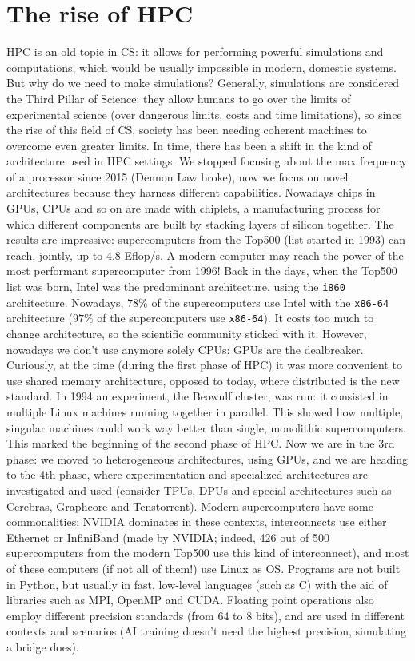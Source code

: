 \chapter{The rise of HPC}

HPC is an old topic in CS: it allows for performing powerful simulations and computations, which would be usually impossible in modern, domestic systems. But why do we need to make simulations? Generally, simulations are considered the Third Pillar of Science: they allow humans to go over the limits of experimental science (over dangerous limits, costs and time limitations), so since the rise of this field of CS, society has been needing coherent machines to overcome even greater limits.
\nwl
In time, there has been a shift in the kind of architecture used in HPC settings. We stopped focusing about the max frequency of a processor since 2015 (Dennon Law broke), now we focus on novel architectures because they harness different capabilities. Nowadays chips in GPUs, CPUs and so on are made with chiplets, a manufacturing process for which different components are built by stacking layers of silicon together.
\nwl
The results are impressive: supercomputers from the Top500 (list started in 1993) can reach, jointly, up to 4.8 Eflop/s. A modern computer may reach the power of the most performant supercomputer from 1996!
\nwl
Back in the days, when the Top500 list was born, Intel was the predominant architecture, using the \verb|i860| architecture. Nowadays, $78\%$ of the supercomputers use Intel with the \verb|x86-64| architecture ($97\%$ of the supercomputers use \verb|x86-64|). It costs too much to change architecture, so the scientific community sticked with it. However, nowadays we don't use anymore solely CPUs: GPUs are the dealbreaker.
\nwl
Curiously, at the time (during the first phase of HPC) it was more convenient to use shared memory architecture, opposed to today, where distributed is the new standard. In 1994 an experiment, the Beowulf cluster, was run: it consisted in multiple Linux machines running together in parallel. This showed how multiple, singular machines could work way better than single, monolithic supercomputers. This marked the beginning of the second phase of HPC. Now we are in the 3rd phase: we moved to heterogeneous architectures, using GPUs, and we are heading to the 4th phase, where experimentation and specialized architectures are investigated and used (consider TPUs, DPUs and special architectures such as Cerebras, Graphcore and Tenstorrent).
\nwl
Modern supercomputers have some commonalities: NVIDIA dominates in these contexts, interconnects use either Ethernet or InfiniBand (made by NVIDIA; indeed, 426 out of 500 supercomputers from the modern Top500 use this kind of interconnect), and most of these computers (if not all of them!) use Linux as OS.
\nwl
Programs are not built in Python, but usually in fast, low-level languages (such as C) with the aid of libraries such as MPI, OpenMP and CUDA. Floating point operations also employ different precision standards (from 64 to 8 bits), and are used in different contexts and scenarios (AI training doesn't need the highest precision, simulating a bridge does).

